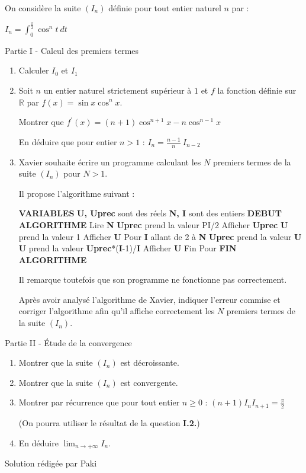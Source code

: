 
%
On considère la suite $(I_n)$ définie pour tout entier naturel $n$ par :
\par
$I_n= \int_0^{ \frac{ \pi } {2}}\cos^nt\ dt $
\begin{h3}Partie I - Calcul des premiers termes\end{h3}
\begin{enumerate}
     \item
     Calculer $I_0$ et $I_1$
     \item
     Soit $n$ un entier naturel strictement supérieur à $1$ et $f$ la fonction définie sur $\mathbb{R}$ par $f(x)=\sin x\cos^{n}x$.
     \par
     Montrer que $f^{\prime}(x)=(n+1)\cos^{n+1} x-n\cos^{n-1}x$
     \par
     En déduire que pour entier $n > 1$ : $I_n= \frac{n-1}{n}\ I_{n-2} $
     \item
     Xavier souhaite écrire un programme calculant les $N$ premiers termes de la suite $(I_n)$ pour $N > 1$.
     \par
     Il propose l'algorithme suivant :
\begin{code}
  \textbf{VARIABLES}
        \textbf{U, Uprec} sont des réels
        \textbf{N, I} sont des entiers
     \textbf{DEBUT ALGORITHME}
        Lire \textbf{N}
        \textbf{Uprec} prend la valeur PI/2
        Afficher \textbf{Uprec}
        \textbf{U} prend la valeur 1
        Afficher \textbf{U}
        Pour \textbf{I} allant de 2 à \textbf{N}
           \textbf{Uprec} prend la valeur \textbf{U}
           \textbf{U} prend la valeur \textbf{Uprec}*(\textbf{I}-1)/\textbf{I}
           Afficher \textbf{U}
        Fin Pour
     \textbf{FIN ALGORITHME}
\end{code}



Il remarque toutefois que son programme ne fonctionne pas correctement.
\par
Après avoir analysé l'algorithme de Xavier, indiquer l'erreur commise et corriger l'algorithme afin qu'il affiche correctement les $N$ premiers termes de la suite $(I_n)$.
\end{enumerate}
\begin{h3}Partie II - Étude de la convergence\end{h3}
\begin{enumerate}
     \item
     Montrer que la suite $(I_n)$ est décroissante.
     \item
     Montrer que la suite $(I_n)$ est convergente.
     \item
     Montrer par récurrence que pour tout entier $n  \geqslant 0$ : $\left(n+1\right)I_nI_{n+1}= \frac{ \pi }{2} $
     \par
     (On pourra utiliser le résultat de la question \textbf{I.2.})
     \item
     En déduire $ \lim_{n \rightarrow  +\infty  }  I_n$.
\end{enumerate}
\begin{corrige}
     Solution rédigée par Paki
     \par
     [pdf-embedder url="/wp-content/uploads/slides/integrales-de-wallis/integrales-de-wallis.pdf" width="676"]
\end{corrige}

